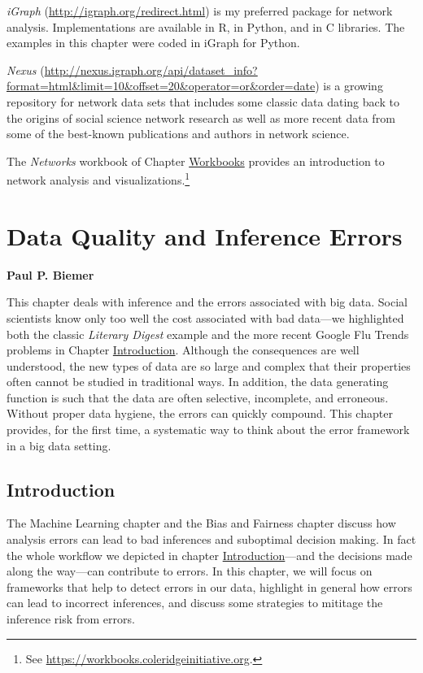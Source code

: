\documentclass[]{krantz}
\begin{document}
\emph{iGraph} (\url{http://igraph.org/redirect.html}) is my preferred
package for network analysis. Implementations are available in R, in
Python, and in C libraries. The examples in this chapter were coded in
iGraph for Python.

\emph{Nexus}
(\url{http://nexus.igraph.org/api/dataset_info?format=html\&limit=10\&offset=20\&operator=or\&order=date})
is a growing repository for network data sets that includes some classic
data dating back to the origins of social science network research as
well as more recent data from some of the best-known publications and
authors in network science.

The \emph{Networks} workbook of Chapter
\protect\hyperlink{chap:workbooks}{Workbooks} provides an introduction
to network analysis and visualizations.\footnote{See
  \url{https://workbooks.coleridgeinitiative.org}.}

\hypertarget{chap:errors}{\chapter{Data Quality and Inference
Errors}\label{chap:errors}}

\textbf{Paul P. Biemer}

This chapter deals with inference and the errors associated with big
data. Social scientists know only too well the cost associated with bad
data---we highlighted both the classic \emph{Literary Digest} example
and the more recent Google Flu Trends problems in Chapter
\protect\hyperlink{chap:intro}{Introduction}. Although the consequences
are well understood, the new types of data are so large and complex that
their properties often cannot be studied in traditional ways. In
addition, the data generating function is such that the data are often
selective, incomplete, and erroneous. Without proper data hygiene, the
errors can quickly compound. This chapter provides, for the first time,
a systematic way to think about the error framework in a big data
setting.

\hypertarget{sec:10-1}{\section{Introduction}\label{sec:10-1}}

The Machine Learning chapter and the Bias and Fairness chapter discuss
how analysis errors can lead to bad inferences and suboptimal decision
making. In fact the whole workflow we depicted in chapter
\protect\hyperlink{chap:intro}{Introduction}---and the decisions made
along the way---can contribute to errors. In this chapter, we will focus
on frameworks that help to detect errors in our data, highlight in
general how errors can lead to incorrect inferences, and discuss some
strategies to mititage the inference risk from errors.
\end{document}
